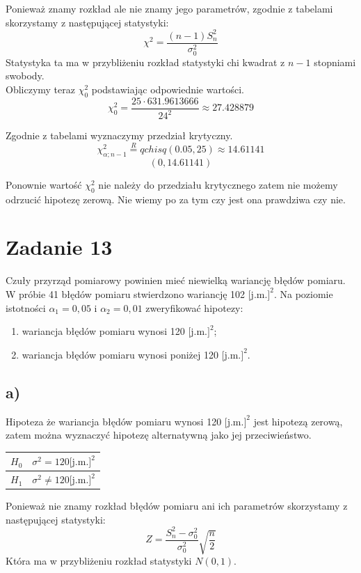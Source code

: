 \documentclass{article}
\begin{document}
Ponieważ znamy rozkład ale nie znamy jego parametrów, zgodnie z tabelami skorzystamy z następującej statystyki:
\[ \chi^2 = \frac{(n-1)S^2_n}{\sigma_0^2} \]
Statystyka ta ma w przybliżeniu rozkład statystyki chi kwadrat z $n-1$ stopniami swobody. \\

Obliczymy teraz $\chi_0^2$ podstawiając odpowiednie wartości.
\[ \chi_0^2 = \frac{25 \cdot 631.9613666}{24^2} \approx 27.428879 \]

Zgodnie z tabelami wyznaczymy przedział krytyczny.
\[ \chi^2_{\alpha;n-1} \overset{R}{=} qchisq(0.05, 25) \approx 14.61141 \]
\[ (0, 14.61141) \]

Ponownie wartość $\chi_0^2$ nie należy do przedziału krytycznego zatem nie możemy odrzucić hipotezę zerową. Nie wiemy po za tym czy jest ona prawdziwa czy nie.

\newpage
\section{Zadanie 13}
Czuły przyrząd pomiarowy powinien mieć niewielką wariancję błędów pomiaru. W próbie 41 błędów pomiaru stwierdzono wariancję 102 $\text{[j.m.]}^2$. Na poziomie istotności $\alpha_1=0,05$ i $\alpha_2=0,01$ zweryfikować hipotezy:
\begin{enumerate}[label = \alph*)]
\item wariancja błędów pomiaru wynosi 120 $\text{[j.m.]}^2$;
\item wariancja błędów pomiaru wynosi poniżej 120 $\text{[j.m.]}^2$.
\end{enumerate}

\subsection{a)}
Hipoteza że wariancja błędów pomiaru wynosi 120 $\text{[j.m.]}^2$ jest hipotezą zerową, zatem można wyznaczyć hipotezę alternatywną jako jej przeciwieństwo.
\begin{center} \begin{tabular}{|c|c|} \hline
$H_0$ & $\sigma^2 = 120 \text{[j.m.]}^2$ \\ \hline
$H_1$ & $\sigma^2 \neq 120 \text{[j.m.]}^2$ \\ \hline
\end{tabular} \end{center}

Ponieważ nie znamy rozkład błędów pomiaru ani ich parametrów skorzystamy z następującej statystyki:
\[ Z = \frac{S_n^2-\sigma_0^2}{\sigma_0^2} \sqrt{\frac{n}{2}} \]
Która ma w przybliżeniu rozkład statystyki $N(0,1)$.
\end{document}
